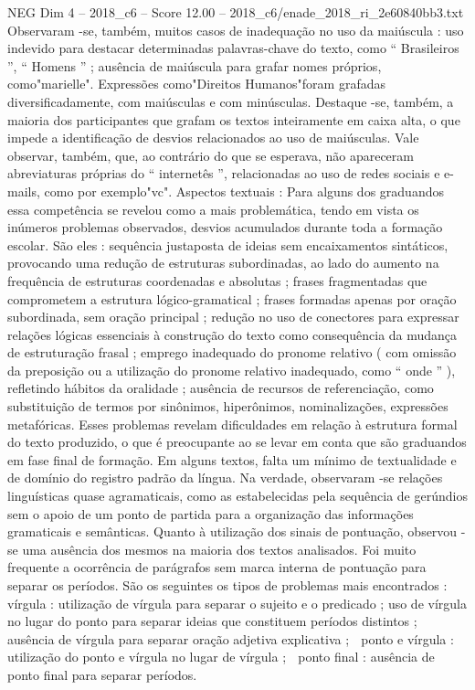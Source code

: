 \begin{textsample}{NEG Dim 4 – 2018\_c6 – Score 12.00 – 2018\_c6/enade\_2018\_ri\_2e60840bb3.txt}
Observaram -se, também, muitos casos de inadequação no uso da maiúscula : uso indevido para destacar determinadas palavras-chave do texto, como “ Brasileiros ”, “ Homens ” ; ausência de maiúscula para grafar nomes próprios, como"marielle".
Expressões como"Direitos Humanos"foram grafadas diversificadamente, com maiúsculas e com minúsculas.
Destaque -se, também, a maioria dos participantes que grafam os textos inteiramente em caixa alta, o que impede a identificação de desvios relacionados ao uso de maiúsculas.
Vale observar, também, que, ao contrário do que se esperava, não apareceram abreviaturas próprias do “ internetês ”, relacionadas ao uso de redes sociais e e-mails, como por exemplo"vc".
Aspectos textuais : Para alguns dos graduandos essa competência se revelou como a mais problemática, tendo em vista os inúmeros problemas observados, desvios acumulados durante toda a formação escolar.
São eles : sequência justaposta de ideias sem encaixamentos sintáticos, provocando uma redução de estruturas subordinadas, ao lado do aumento na frequência de estruturas coordenadas e absolutas ; frases fragmentadas que comprometem a estrutura lógico-gramatical ; frases formadas apenas por oração subordinada, sem oração principal ; redução no uso de conectores para expressar relações lógicas essenciais à construção do texto como consequência da mudança de estruturação frasal ; emprego inadequado do pronome relativo ( com omissão da preposição ou a utilização do pronome relativo inadequado, como “ onde ” ), refletindo hábitos da oralidade ; ausência de recursos de referenciação, como substituição de termos por sinônimos, hiperônimos, nominalizações, expressões metafóricas.
Esses problemas revelam dificuldades em relação à estrutura formal do texto produzido, o que é preocupante ao se levar em conta que são graduandos em fase final de formação.
Em alguns textos, falta um mínimo de textualidade e de domínio do registro padrão da língua.
Na verdade, observaram -se relações linguísticas quase agramaticais, como as estabelecidas pela sequência de gerúndios sem o apoio de um ponto de partida para a organização das informações gramaticais e semânticas.
Quanto à utilização dos sinais de pontuação, observou -se uma ausência dos mesmos na maioria dos textos analisados.
Foi muito frequente a ocorrência de parágrafos sem marca interna de pontuação para separar os períodos.
São os seguintes os tipos de problemas mais encontrados :  vírgula : utilização de vírgula para separar o sujeito e o predicado ; uso de vírgula no lugar do ponto para separar ideias que constituem períodos distintos ; ausência de vírgula para separar oração adjetiva explicativa ;  ponto e vírgula : utilização do ponto e vírgula no lugar de vírgula ;  ponto final : ausência de ponto final para separar períodos.

\end{textsample}
